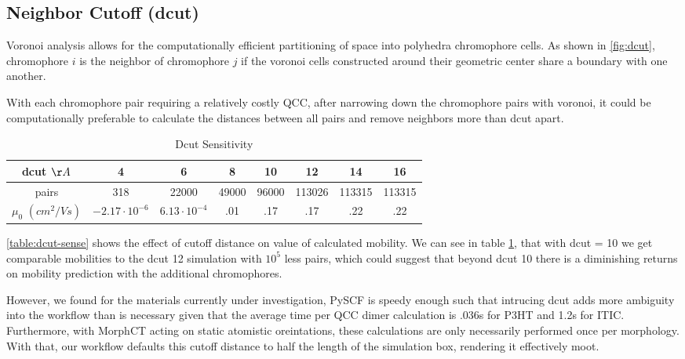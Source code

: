 \subsection{Neighbor Cutoff (dcut)}
\label{dcutresults}
Voronoi analysis allows for the computationally efficient partitioning of space into
polyhedra chromophore cells. As shown in \ref{fig:dcut}, chromophore $i$ is the neighbor of chromophore $j$
if the voronoi cells constructed around their geometric center
share a boundary with one another. 

With each chromophore pair requiring a relatively costly QCC, after narrowing down the chromophore pairs with voronoi, it
could be
computationally preferable to calculate the distances between all pairs and remove neighbors more than dcut
apart.

\begin{table}[ht]
\caption{Dcut Sensitivity}
\centering %
\begin{tabular}{c c c c c c c c} %
\hline\hline %
dcut $\AA$ & 4 & 6 & 8 & 10 & 12 & 14 & 16 \\ [0.5ex] %
\hline  %
pairs & 318 & 22000 & 49000 & 96000 & 113026 & 113315 & 113315 \\ [1ex]%
$\mu_{0}$ $(cm^{2}/Vs)$ & $-2.17 \cdot 10^{-6}$ & $6.13 \cdot 10^{-4}$ & .01 & .17 & .17 & .22 & .22 \\ [1ex] %
\hline %
\end{tabular}
\label{table:dcut-sense} %
\end{table}

\autoref{table:dcut-sense} shows the effect of cutoff distance on value of
calculated mobility.  
 We can see in table \ref{table:dcut-sense}, that with dcut = 10 we get comparable mobilities to the
dcut 12 simulation with $10^5$ less
pairs, which could suggest that beyond dcut 10 there is a diminishing returns on mobility prediction with the
additional chromophores. 

However, we found for the materials currently under investigation,
PySCF is speedy enough such that intrucing dcut adds more ambiguity
into the workflow than is necessary given that the average time per QCC dimer calculation is .036s for P3HT and
1.2s for ITIC. Furthermore, with MorphCT acting on static atomistic oreintations, these calculations 
are only necessarily performed once per morphology. With that, our workflow defaults this cutoff distance to half
the length of the simulation box, rendering it effectively moot. 

